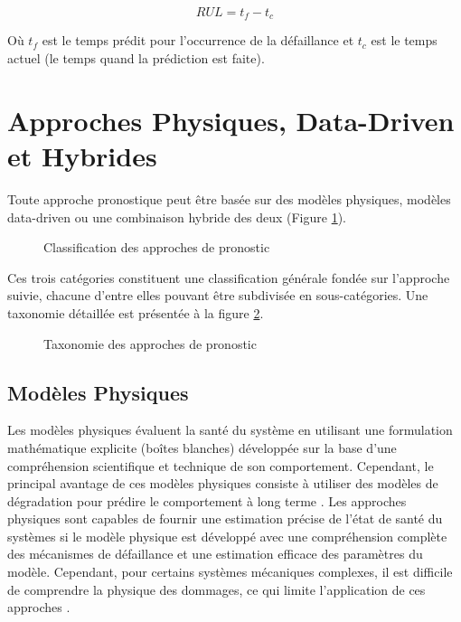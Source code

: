 \begin{equation}
    RUL = t_f-t_c
    \label{eq:rul}
\end{equation}

Où $t_f$ est le temps prédit pour l’occurrence de la défaillance et $t_c$ est le temps actuel (le temps quand la prédiction est faite).

\section{Approches Physiques, Data-Driven et Hybrides}
\label{section:prognostics-approaches}
Toute approche pronostique peut être basée sur des modèles physiques, modèles data-driven ou une combinaison hybride des deux (Figure \ref{fig:prognostic-approaches-venn}).

\begin{figure}[ht]
    \centering
	
    \caption{Classification des approches de pronostic}
    \label{fig:prognostic-approaches-venn}
\end{figure}

Ces trois catégories constituent une classification générale fondée sur l'approche suivie, chacune d'entre elles pouvant être subdivisée en sous-catégories. Une taxonomie détaillée est présentée à la figure \ref{fig:prognostic-approaches-tree}.
\begin{figure}[ht]
	\resizebox{\textwidth}{!}{}
    \caption{Taxonomie des approches de pronostic \cite{Javed2017}}
    \label{fig:prognostic-approaches-tree}
\end{figure}

\subsection{Modèles Physiques}
Les modèles physiques évaluent la santé du système en utilisant une formulation mathématique explicite (boîtes blanches) développée sur la base d'une compréhension scientifique et technique de son comportement. Cependant, le principal avantage de ces modèles physiques consiste à utiliser des modèles de dégradation pour prédire le comportement à long terme \cite{Cubillo2016}. Les approches physiques sont capables de fournir une estimation précise de l'état de santé du systèmes si le modèle physique est développé avec une compréhension complète des mécanismes de défaillance et une estimation efficace des paramètres du modèle. Cependant, pour certains systèmes mécaniques complexes, il est difficile de comprendre la physique des dommages, ce qui limite l'application de ces approches \cite{Lei2018}.

